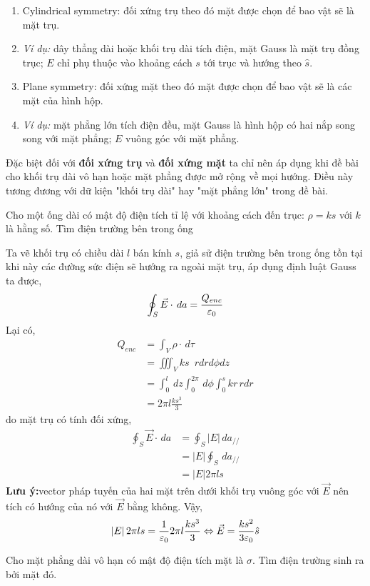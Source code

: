\begin{enumerate}
\begin{enumerate}[label={}]
\item{Cylindrical symmetry:} đối xứng trụ theo đó mặt được chọn để bao vật sẽ là mặt trụ.
\item \textit{Ví dụ:} dây thẳng dài hoặc khối trụ dài tích điện, mặt Gauss là mặt trụ đồng trục; $E$ chỉ phụ thuộc vào khoảng cách $s$ tới trục và hướng theo $\hat{s}$.
\item{Plane symmetry:} đối xứng mặt theo đó mặt được chọn để bao vật sẽ là các mặt của hình hộp.
\item \textit{Ví dụ:} mặt phẳng lớn tích điện đều, mặt Gauss là hình hộp có hai nắp song song với mặt phẳng; $E$ vuông góc với mặt phẳng.
\end{enumerate}
Đặc biệt đối với \textbf{đối xứng trụ} và \textbf{đối xứng mặt} ta chỉ nên áp dụng khi đề bài cho khối trụ dài vô hạn hoặc mặt phẳng được mở rộng về mọi hướng. Điều này tương đương với dữ kiện "khối trụ dài" hay "mặt phẳng lớn" trong đề bài.

\begin{problem}
Cho một ống dài có mật độ điện tích tỉ lệ với khoảng cách đến trục: $\rho = ks$ với $k$ là hằng số. Tìm điện trường bên trong ống
\end{problem}

\begin{sol}
Ta vẽ khối trụ có chiều dài $l$ bán kính $s$, giả sử điện trường bên trong ống tồn tại khi này các đường sức điện sẽ hướng ra ngoài mặt trụ, áp dụng định luật Gauss ta được,
\[
\oint_{S} \vec{E} \cdot \, da =  \frac{Q_{enc}}{\varepsilon_{0}}
\]
Lại có,
\begin{align*}
Q_{enc} &= \int_{V} \rho \cdot \, d \tau \\[6pt]
&= \iiint_V ks \, \, \, rdr d\phi dz \\[6pt]
&= \int_{0}^{l} \, dz \int_{0}^{2\pi} \, d\phi \int_{0}^{s} kr \, rdr \\[6pt]
&= 2\pi l \frac{ks^3}{3}
\end{align*}
do mặt trụ có tính đối xứng,
\begin{align*}
\oint_{S} \vec{E} \cdot \, da &=  \oint_{S} \left| E \right|  \, da_{//} \\[6pt]
&= \left| E \right| \oint_{S}  \, da_{//} \\[6pt]
&= \left| E \right| 2\pi l s
\end{align*}
\textbf{Lưu ý:}vector pháp tuyến của hai mặt trên dưới khối trụ vuông góc với $\vec{E}$ nên tích có hướng của nó với $\vec{E}$ bằng không.
Vậy,
\[
\left| E \right| 2\pi l s = \frac{1}{\varepsilon_{0}} 2\pi l \frac{ks^3}{3} \Leftrightarrow \vec{E} = \frac{k s^2}{3 \varepsilon_{0}}\hat{s}
\]
\end{sol}
\begin{problem}
Cho mặt phẳng dài vô hạn có mật độ điện tích mặt là $\sigma$. Tìm điện trường sinh ra bởi mặt đó.
\end{problem}


\end{enumerate}
